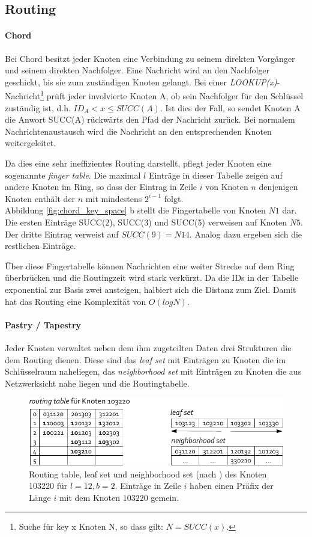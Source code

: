 \subsection{Routing}
\paragraph{Chord}
Bei Chord besitzt jeder Knoten eine Verbindung zu seinem direkten Vorgänger und seinem direkten Nachfolger. Eine Nachricht wird an den Nachfolger geschickt, bis sie zum zuständigen Knoten gelangt. Bei einer \emph{LOOKUP(x)}-Nachricht\footnote{Suche für key x Knoten N, so dass gilt: $N = SUCC(x)$.} prüft jeder involvierte Knoten A, ob sein Nachfolger für den Schlüssel zuständig ist, d.h. $ID_A < x \le SUCC(A)$. Ist dies der Fall, so sendet Knoten A die Anwort SUCC(A) rückwärts den Pfad der Nachricht zurück. Bei normalem Nachrichtenaustausch wird die Nachricht an den entsprechenden Knoten weitergeleitet.

Da dies eine sehr ineffizientes  Routing darstellt, pflegt jeder Knoten eine sogenannte \emph{finger table}. Die maximal $l$ Einträge in dieser Tabelle zeigen auf andere Knoten im Ring, so dass der Eintrag in Zeile $i$ von Knoten $n$ denjenigen Knoten enthält der $n$ mit mindestens $2^{i-1}$ folgt.\\
Abbildung \ref{fig:chord_key_space} b stellt die Fingertabelle von Knoten $N1$ dar. Die ersten Einträge SUCC(2), SUCC(3) und SUCC(5) verweisen auf Knoten $N5$. Der dritte Eintrag verweist auf $SUCC(9) = N14$. Analog dazu ergeben sich die restlichen Einträge.

Über diese Fingertabelle können Nachrichten eine weiter Strecke auf dem Ring überbrücken und die Routingzeit wird stark verkürzt. Da die IDs in der Tabelle exponential zur Basis zwei ansteigen, halbiert sich die Distanz zum Ziel. Damit hat das Routing eine Komplexität von $O(log N)$.

\paragraph{Pastry / Tapestry}
Jeder Knoten verwaltet neben dem ihm zugeteilten Daten drei Strukturen die dem Routing dienen. Diese sind das \emph{leaf set} mit Einträgen zu Knoten die im Schlüsselraum naheliegen, das \emph{neighborhood set} mit Einträgen zu Knoten die aus Netzwerksicht nahe liegen und die Routingtabelle.

\begin{figure}[htb]
\centering
\includegraphics{grafics/pastry_routing_table.pdf}
\caption{Routing table, leaf set und neighborhood set (nach \cite{Goetz2005}) des Knoten 103220 für $l=12, b=2$. Einträge in Zeile $i$ haben einen Präfix der Länge $i$ mit dem Knoten $103220$ gemein.}
\label{fig:pastry_routing_table}
\end{figure}

